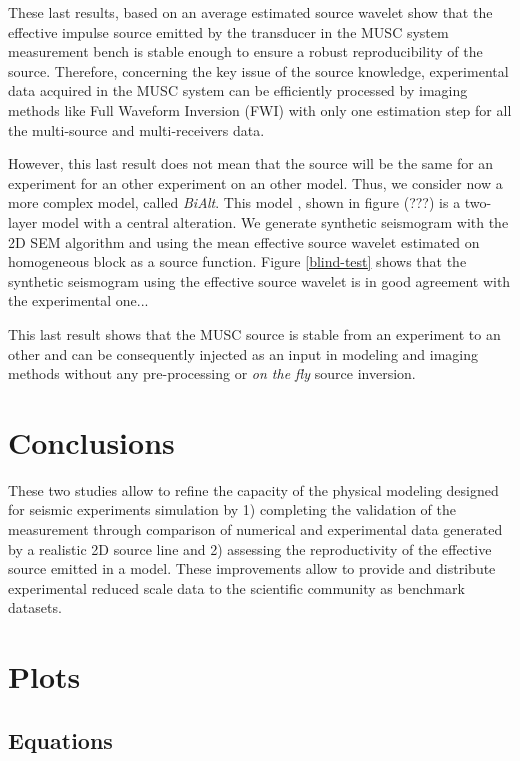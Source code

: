 \documentclass[manuscript,revised]{geophysics}
\begin{document}
\noindent These last results, based on an average estimated source wavelet show that the effective impulse source emitted by the transducer in the MUSC system measurement bench is stable enough to ensure a robust reproducibility of the source. Therefore, concerning the key issue of the source knowledge, experimental data acquired in the MUSC system can be efficiently processed by imaging methods like Full Waveform Inversion (FWI) with only one estimation step for all the multi-source and multi-receivers data.

\noindent However, this last result does not mean that the source will be the same for an experiment for an other experiment on an other model. Thus, we consider now a more complex model, called \textit{BiAlt}. This model , shown in figure (???) is a two-layer model with a central alteration. We generate synthetic seismogram with the 2D SEM algorithm and using the mean effective source wavelet estimated on homogeneous block as a source function. Figure \ref{blind-test} shows that the synthetic seismogram using the effective source wavelet is in good agreement with the experimental one...

\noindent This last result shows that the MUSC source is stable from an experiment to an other and can be consequently injected as an input in modeling and imaging methods without any pre-processing or \textit{on the fly} source inversion.


\section{Conclusions}

\noindent These two studies allow to refine the capacity of the physical modeling designed for seismic experiments simulation by 1) completing the validation of the measurement through comparison of numerical and experimental data generated by a realistic 2D source line and 2) assessing the reproductivity of the effective source emitted in a model. These improvements allow to provide and distribute experimental reduced scale data to the scientific community as benchmark datasets.

\section{Plots}

\subsection*{Equations}
\end{document}
